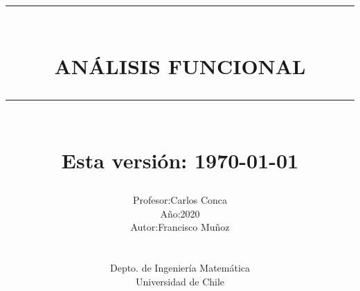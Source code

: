 
\newcommand{\HRule}[1]{\rule{\linewidth}{#1}} 	%

\makeatletter							%
\def\printtitle{%
    {\centering \@title\par}}
\makeatother									

\makeatletter							%
\def\printauthor{%
    {\centering \large \@author}}				
\makeatother							

\title{     \HRule{1pt} \\[12pt]						%
			 \textbf{\uppercase{\LARGE Análisis Funcional}}	%
			\HRule{1.5pt} \\ [0.2cm]		%
			\large Esta versión: \today
		}

\author{
    \begin{tabular}{rl}
        Profesor: & Carlos Conca\\
        Año: & 2020\\
		Autor: & Francisco Muñoz
    \end{tabular}\\[1.25]
    \begin{center}
        Depto. de Ingeniería Matemática \\
        Universidad de Chile \\[1.25cm]
    \end{center}
}

